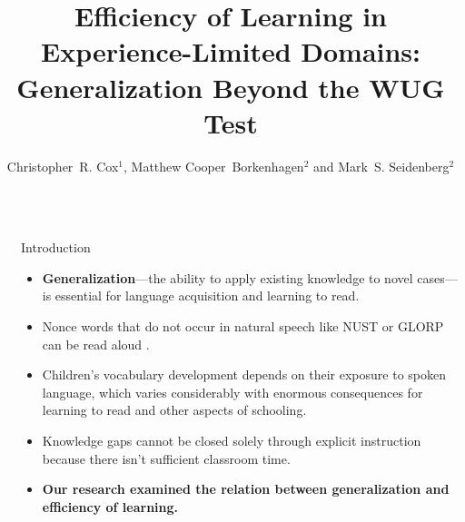 \documentclass[final]{beamer}
\title{Efficiency of Learning in Experience-Limited Domains:\\Generalization Beyond the WUG Test} %
\author{Christopher~R. Cox$^1$, Matthew Cooper~Borkenhagen$^2$ and Mark~S. Seidenberg$^2$} %
\institute{1. Louisiana State University, 2. University of Wisconsin-Madison} %
\newlength{\sepwid}
\newlength{\onecolwid}
\begin{document}

\setlength{\belowcaptionskip}{2ex} %
\setlength\belowdisplayshortskip{2ex} %

\begin{frame}[t] %

\begin{columns}[t] %

\begin{column}{\sepwid}\end{column} %

\begin{column}{\onecolwid} %

\begin{alertblock}{Introduction}

\begin{itemize}
    \item \textbf{Generalization}---the ability to apply existing knowledge to novel cases---is essential for language acquisition and learning to read.
    \item Nonce words that do not occur in natural speech like NUST or GLORP can be read aloud \cite{Seidenberg1989}.
    \item Children's vocabulary development depends on their exposure to spoken language, which varies considerably \cite{Hart1995,Gilkerson2017} with enormous consequences for learning to read and other aspects of schooling.
    \item Knowledge gaps cannot be closed solely through explicit instruction because there isn't sufficient classroom time.
    \item \textbf{Our research examined the relation between generalization and efficiency of learning.}
\end{itemize}
\end{alertblock}


\end{column}
\end{columns}
\end{frame}
\end{document}
